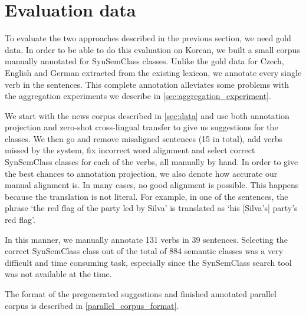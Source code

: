 \section{Evaluation data}
\label{sec:eval_data}

To evaluate the two approaches described in the previous section, we need gold data. In order to be able to do this evaluation on Korean, we built a small corpus manually annotated for SynSemClass classes. Unlike the gold data for Czech, English and German extracted from the existing lexicon, we annotate every single verb in the sentences. This complete annotation alleviates some problems with the aggregation experiments we describe in \cref{sec:aggregation_experiment}.

We start with the news corpus described in \cref{sec:data} and use both annotation projection and zero-shot cross-lingual transfer to give us suggestions for the classes. We then go and remove misaligned sentences (15 in total), add verbs missed by the system, fix incorrect word alignment and select correct SynSemClass classes for each of the verbs, all manually by hand. In order to give the best chances to annotation projection, we also denote how accurate our manual alignment is. In many cases, no good alignment is possible. This happens because the translation is not literal. For example, in one of the sentences, the phrase  `the red flag of the party led by Silva' is translated as `his [Silva's] party's red flag'.

In this manner, we manually annotate 131 verbs in 39 sentences. Selecting the correct SynSemClass class out of the total of 884 semantic classes was a very difficult and time consuming task, especially since the SynSemClass search tool was not available at the time.

The format of the pregenerated suggestions and finished annotated parallel corpus is described in \cref{parallel_corpus_format}.